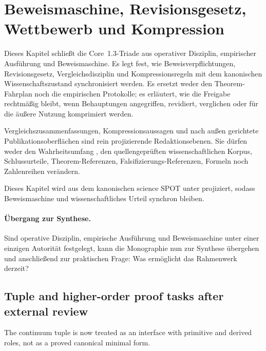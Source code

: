 \section{Beweismaschine, Revisionsgesetz, Wettbewerb und Kompression}
\label{sec:oc-core-1-3-proof-machinery-de}

Dieses Kapitel schließt die Core~1.3-Triade aus operativer Disziplin,
empirischer Ausführung und Beweismaschine. Es legt fest, wie
Beweisverpflichtungen, Revisionsgesetz, Vergleichsdisziplin und
Kompressionsregeln mit dem kanonischen Wissenschaftszustand synchronisiert
werden. Es ersetzt weder den Theorem-Fahrplan noch die empirischen
Protokolle; es erläutert, wie die Freigabe rechtmäßig bleibt, wenn Behauptungen
angegriffen, revidiert, verglichen oder für die äußere Nutzung komprimiert
werden.

Vergleichszusammenfassungen, Kompressionsaussagen und nach außen gerichtete
Publikationsoberflächen sind rein projizierende Redaktionsebenen. Sie dürfen
weder den Wahrheitsumfang , den quellengeprüften
wissenschaftlichen Korpus, Schlussurteile, Theorem-Referenzen,
Falsifizierungs-Referenzen, Formeln noch Zahlenreihen verändern.

Dieses Kapitel wird aus dem kanonischen science SPOT
 unter
projiziert, sodass Beweismaschine und wissenschaftliches Urteil synchron
bleiben.



\paragraph{Übergang zur Synthese.}
Sind operative Disziplin, empirische Ausführung und Beweismaschine unter
einer einzigen Autorität festgelegt, kann die Monographie nun zur Synthese
übergehen und anschließend zur praktischen Frage: Was ermöglicht das
Rahmenwerk derzeit?


\subsection{Tuple and higher-order proof tasks after external review}
\label{sec:oc13-tuple-higher-order-obligations-v3}

The continuum tuple is now treated as an interface with primitive and derived
roles, not as a proved canonical minimal form.


